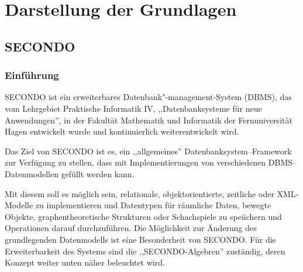 
\chapter[Darstellung der Grundlagen ]{Darstellung der Grundlagen} \label{Kapitel2}
\minitoc
\newpage
\section{SECONDO}\label{SecondoEinfuehrung}

\subsection{Einführung}
SECONDO ist ein erweiterbares Datenbank"-management-System (DBMS), das vom Lehrgebiet Praktische Informatik IV, ,,Datenbanksysteme für neue Anwendungen'', in der Fakultät Mathematik und Informatik der Fernuniversität Hagen entwickelt wurde und kontinuierlich weiterentwickelt wird.

Das Ziel von SECONDO ist es, ein ,,allgemeines'' Datenbanksystem--Framework zur Verfügung zu stellen, dass mit Implementierungen von verschiedenen DBMS--Datenmodellen gefüllt werden kann.

Mit diesem soll es möglich sein, relationale, objektorientierte, zeitliche oder XML-Modelle zu implementieren und Datentypen für räumliche Daten, bewegte Objekte, graphentheoretische Strukturen oder Schachspiele zu speiichern und Operationen darauf durchzuführen. Die Möglichkeit zur Änderung des grundlegenden Datenmodells ist eine Besonderheit von SECONDO. Für die Erweiterbarkeit des Systems sind die ,,SECONDO-Algebren'' zuständig, deren Konzept weiter unten näher beleuchtet wird.

